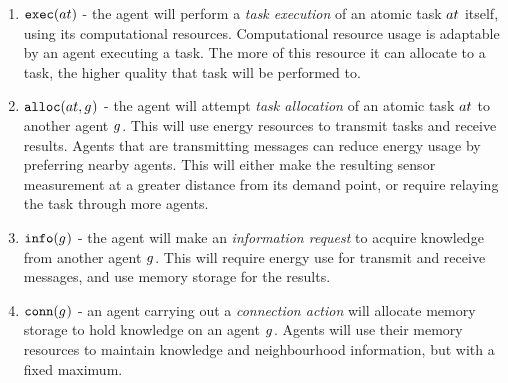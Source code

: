 \begin{enumerate}
	\item $\functionExec{}{}$ - the agent will perform a \textit{task execution} of an atomic task $\varAtomicTask{}{}$ itself, using its computational resources. Computational resource usage is adaptable by an agent executing a task. The more of this resource it can allocate to a task, the higher quality that task will be performed to.

	\item $\functionAlloc{}{}$ - the agent will attempt \textit{task allocation} of an atomic task $\varAtomicTask{}{}$ to another agent $g_{}^{}$. This will use energy resources to transmit tasks and receive results. Agents that are transmitting messages can reduce energy usage by preferring nearby agents. This will either make the resulting sensor measurement at a greater distance from its demand point, or require relaying the task through more agents.

	\item  $\functionInfo{}{}$ - the agent will make an \textit{information request} to acquire knowledge from another agent $g_{}^{}$. This will require energy use for transmit and receive messages, and use memory storage for the results. 
	\item $\functionLink{}{}$ -  an agent carrying out a \textit{connection action} will allocate memory storage to hold knowledge on an agent $g_{}^{}$.  Agents will use their memory resources to maintain knowledge and neighbourhood information, but with a fixed maximum.
\end{enumerate}


